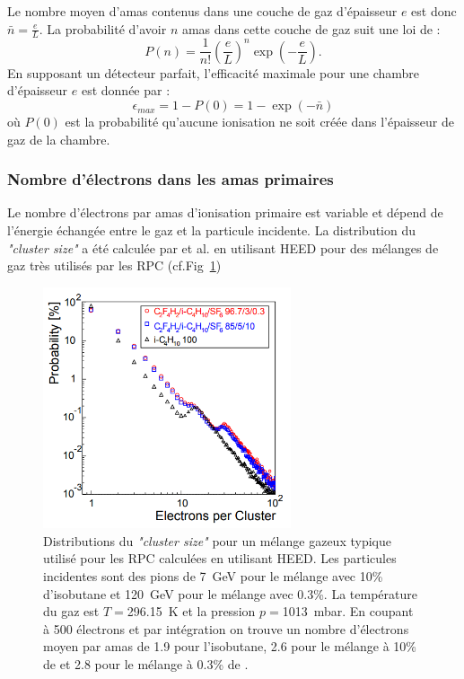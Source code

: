 Le nombre moyen d'amas contenus dans une couche de gaz d'épaisseur $e$ est donc $\bar{n}=\frac{e}{L}$. La probabilité d'avoir $n$ amas dans cette couche de gaz suit une loi de  :
\begin{equation}
P(n)=\frac{1}{n!}\left(\frac{e}{L}\right)^{n}\exp\left(-\frac{e}{L}\right).
\end{equation}
En supposant un détecteur parfait, l'efficacité maximale pour une chambre d'épaisseur $e$ est donnée par :
\begin{equation}
\epsilon_{max}=1-P(0)=1-\exp\left(-\bar{n}\right)
\end{equation}
où $P(0)$ est la probabilité qu'aucune ionisation ne soit créée dans l'épaisseur de gaz de la chambre.

\subsubsection{Nombre d'électrons dans les amas primaires}
Le nombre d'électrons par amas d'ionisation primaire est variable et dépend de l'énergie échangée entre le gaz et la particule incidente. La distribution du \textit{"cluster size"} a été calculée par  et al. \cite{Riegler:570462} en utilisant HEED pour des mélanges de gaz très utilisés par les RPC (cf.Fig~\ref{cluster})
\begin{figure}[ht!]
	\centering
	\includegraphics[width=0.65\textwidth]{RPC/cluster.png}
	\captionsetup{type=subfigure}\caption{Distributions du \textit{"cluster size"} pour un mélange gazeux typique utilisé pour les RPC calculées en utilisant HEED. Les particules incidentes sont des pions de \SI{7}{\giga\eV} pour le mélange avec \num{10}\% d'isobutane et \SI{120}{\giga\eV} pour le mélange avec \num{0.3}\%. La température du gaz est $T=$\SI{296.15}{\kelvin} et la pression $p=$\SI{1013}{\milli\bar}. En coupant à \num{500} électrons et par intégration on trouve un nombre d'électrons moyen par amas de \num{1.9} pour l'isobutane, \num{2.6} pour le mélange à \num{10}\% de  et \num{2.8} pour le mélange à \num{0.3}\% de .}
	\label{cluster}
\end{figure}

